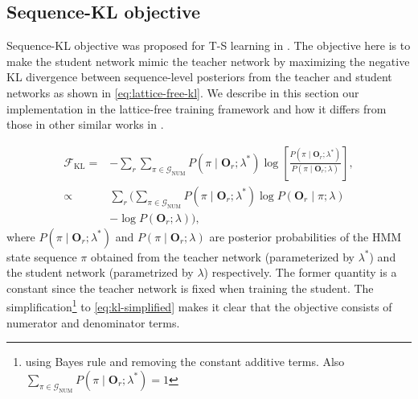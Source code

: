 \documentclass{article}
\newcommand{\oOr}[1]{\mathbf{O}_{#1}}
\newcommand{\pr}{{P}}
\newcommand{\lat}{\mathcal{L}}
\newcommand{\NumG}{\mathcal{G}_\text{NUM}}
\newcommand{\Fkl}{\mathcal{F}_\text{KL}}
\begin{document}
\subsection{Sequence-KL objective}
\label{sec:seq-kl}

Sequence-KL objective was proposed for T-S learning
in \cite{wong2016sequence-ts}. The objective here is to make the student network
mimic the teacher network by maximizing the 
negative KL divergence between sequence-level posteriors from the teacher and 
student networks as shown in \eqref{eq:lattice-free-kl}. 
We describe in this section our implementation in the lattice-free training
framework and how it differs from those in other similar works in
\cite{wong2016sequence-ts,kanda2017sequence-kl}.

\begin{align}
  \Fkl =& -\sum_r \sum_{\pi\in\NumG} \pr(\pi\mid \oOr{r}; \lambda^*) 
  \log\left[\frac{\pr(\pi\mid \oOr{r}; \lambda^*)}{\pr(\pi\mid \oOr{r};
  \lambda)}\right], \label{eq:lattice-free-kl} \\
  \propto& \sum_r \biggl(\sum_{\pi\in\NumG} \pr(\pi\mid \oOr{r}; \lambda^*)\log 
  \pr(\oOr{r}\mid \pi; \lambda) \nonumber \\
  & - \log \pr(\oOr{r}; \lambda) \biggr),\label{eq:kl-simplified}
\end{align}
where 
$\pr(\pi\mid \oOr{r}; \lambda^*)$ and
$\pr(\pi\mid \oOr{r}; \lambda)$ are posterior probabilities of 
the HMM state sequence $\pi$ obtained from the teacher network (parameterized by
$\lambda^*$) and the student network (parametrized by $\lambda$) respectively.
The former quantity is a constant since the teacher network is
fixed when training the student. The simplification\footnote{using Bayes rule and removing 
  the constant additive terms. Also $\sum_{\pi\in\NumG} \pr(\pi\mid \oOr{r};
\lambda^*)=1$} to \eqref{eq:kl-simplified} 
makes it clear that the objective
consists of numerator and denominator terms.
\end{document}
